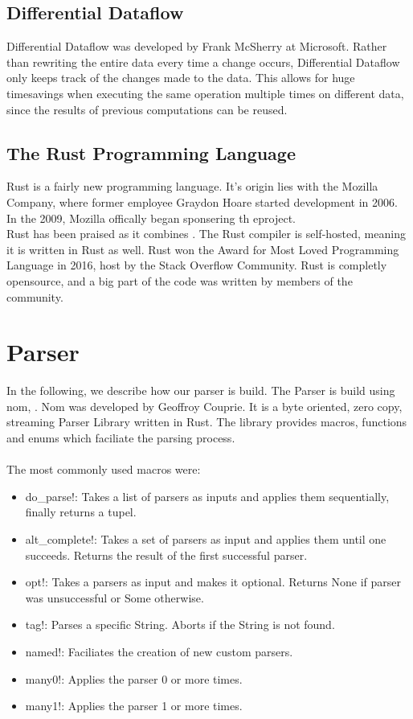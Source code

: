 \documentclass[11pt,singlecolumn]{scrartcl}
\begin{document}
\clearpage

\subsection{Differential Dataflow}

Differential Dataflow was developed by Frank McSherry at Microsoft. \cite{Differential}
Rather than rewriting the entire data every time a change occurs, Differential Dataflow only keeps track of the changes made to the data. This allows for huge timesavings when executing the same operation multiple times on different data, since the results of previous computations can be reused.
\clearpage

\subsection{The Rust Programming Language}
Rust is a fairly new programming language. It's origin lies with the Mozilla Company, where former employee Graydon Hoare started development in 2006. In the 2009, Mozilla offically began sponsering th eproject.\\
Rust has been praised as it combines . The Rust compiler is self-hosted, meaning it is written in Rust as well. Rust won the Award for Most Loved Programming Language in 2016, host by the Stack Overflow Community.
Rust is completly opensource, and a big part of the code was written by members of the community.
\clearpage

\section{Parser}
In the following, we describe how our parser is build. The Parser is build using nom, \cite {Nom}. Nom was developed by Geoffroy Couprie. It is a byte oriented, zero copy, streaming Parser Library written in Rust. The library provides macros, functions and enums which faciliate the parsing process.\\\\
The most commonly used macros were:
\begin{itemize} 
\item do\_parse!: Takes a list of parsers as inputs and applies them sequentially, finally returns a tupel.
\item alt\_complete!: Takes a set of parsers as input and applies them until one succeeds. Returns the result of the first successful parser.
\item opt!: Takes a parsers as input and makes it optional. Returns None if parser was unsuccessful or Some otherwise.
\item tag!: Parses a specific String. Aborts if the String is not found.
\item named!: Faciliates the creation of new custom parsers.
\item many0!: Applies the parser 0 or more times.
\item many1!: Applies the parser 1 or more times. 
\end{itemize}
\end{document}
